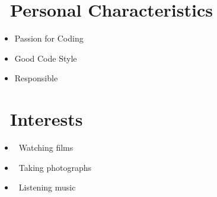 \documentclass{resume}
\begin{document}
\section{\faUser\ Personal Characteristics} \vspace{1mm}

\begin{itemize}[parsep=1ex]
	\item Passion for Coding
	\item Good Code Style
	\item Responsible
\end{itemize}

\section{\faSunO\ Interests} \vspace{1mm}

\begin{itemize}[parsep=1ex]
	\item \faFilm\ {Watching films}
	\item \faCamera\ {Taking photographs}
	\item \faHeadphones\ {Listening music}
\end{itemize}

\end{document}
